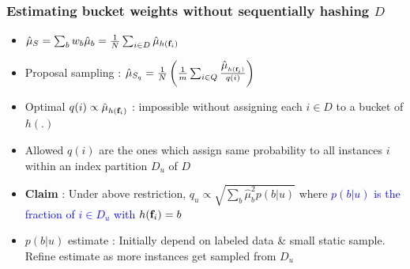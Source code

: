 \documentclass[usenames,dvipsnames, 11pt]{beamer}
\newcommand{\vek}[1]{{\bf {#1}}}
\newcommand{\vft}{{\vek{f}}}
\newcommand{\wt}{{p}}
\newcommand{\estSS}{{\mbox{$\hat{\mu}_S$}}}
\newcommand{\estSb}{{\mbox{$\hat{\mu}$}}}
\newlength{\wideitemsep}
\let\olditem\item
\renewcommand{\item}{\setlength{\itemsep}{\wideitemsep}\olditem}
\begin{document}
\begin{frame}
\frametitle{Estimating bucket weights without sequentially hashing $D$}
\begin{itemize}
\pause
\item $\estSS=\sum_b{w_b\hat{\mu}_b}=\frac{1}{N}\sum_{i \in D}\hat{\mu}_{h(\vft_i)}$
\pause
\item Proposal sampling : $\hat{\mu}_{S_q} = \frac{1}{N}\left(\frac{1}{m}\sum_{i\in Q} \frac{\estSb_{h(\vft_i)}}{q(i)}\right)$
\pause
\item Optimal $q(i) \propto \estSb_{h(\vft_i)}$ : impossible without assigning each $i \in D$ to a bucket of $h(.)$
\pause
\item Allowed $q(i)$ are the ones which assign same probability to all instances $i$ within an index partition $D_u$ of $D$
\pause
\item \textbf{Claim} : Under above restriction, $q_u \propto \sqrt{\sum_{b}\estSb^2_b\wt(b|u)}$ where \textcolor{blue}{$\wt(b|u)$ is the fraction of  $i\in D_u$ with $h(\vft_i)=b$}
\pause
\item $\wt(b|u)$ estimate : Initially depend on labeled data \& small static sample. Refine estimate as more instances get sampled from $D_u$
\end{itemize}
\end{frame}

\end{document}
